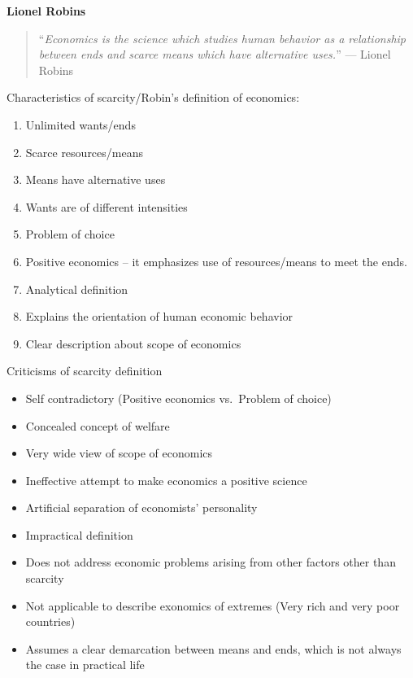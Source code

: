 \documentclass[11pt,]{book}
\providecommand{\tightlist}{%
  \setlength{\itemsep}{0pt}\setlength{\parskip}{0pt}}
\theoremstyle{definition}
\theoremstyle{definition}
\theoremstyle{definition}
\theoremstyle{remark}
\begin{document}
\textbf{Lionel Robins}

\begin{quote}
``\emph{Economics is the science which studies human behavior as a
relationship between ends and scarce means which have alternative
uses.}'' --- Lionel Robins
\end{quote}

Characteristics of scarcity/Robin's definition of economics:

\begin{enumerate}
\def\labelenumi{\arabic{enumi}.}
\tightlist
\item
  Unlimited wants/ends
\item
  Scarce resources/means
\item
  Means have alternative uses
\item
  Wants are of different intensities
\item
  Problem of choice
\item
  Positive economics -- it emphasizes use of resources/means to meet the
  ends.
\item
  Analytical definition
\item
  Explains the orientation of human economic behavior
\item
  Clear description about scope of economics
\end{enumerate}

Criticisms of scarcity definition

\begin{itemize}
\tightlist
\item
  Self contradictory (Positive economics vs.~Problem of choice)
\item
  Concealed concept of welfare
\item
  Very wide view of scope of economics
\item
  Ineffective attempt to make economics a positive science
\item
  Artificial separation of economists' personality
\item
  Impractical definition
\item
  Does not address economic problems arising from other factors other
  than scarcity
\item
  Not applicable to describe exonomics of extremes (Very rich and very
  poor countries)
\item
  Assumes a clear demarcation between means and ends, which is not
  always the case in practical life
\end{itemize}
\end{document}
